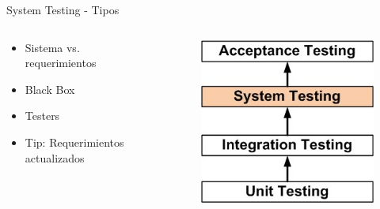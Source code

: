 \documentclass{beamer}
\begin{document}
\begin{frame}{System Testing - Tipos}
\begin{columns}[T]
\begin{column}[T]{6cm}
\begin{itemize}
\item Sistema vs. requerimientos
\item Black Box
\item Testers
\item Tip: Requerimientos actualizados
\end{itemize}
\end{column}
\begin{column}[T]{4cm} %
\begin{figure}
\centering
\includegraphics[width=0.8\linewidth]{Images/systemtesting}
\end{figure}
\end{column}
\end{columns}
\end{frame}
\end{document}
